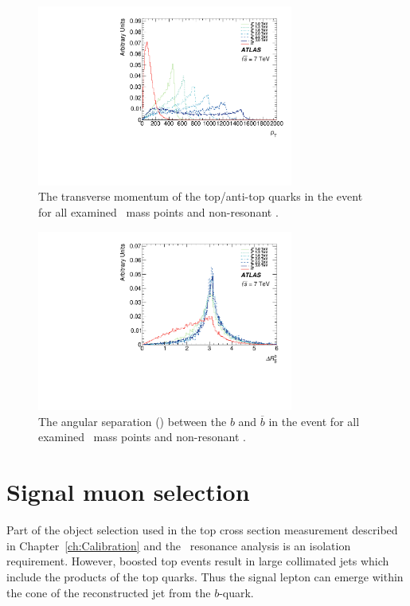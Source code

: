 \begin{figure}[htbp]
  \centering
  \includegraphics[width=0.75\textwidth]{PartBoosted/Plots/h_trtop_pt.pdf}
  \caption{The transverse momentum of the top/anti-top quarks in the event for all examined \Zprime\ mass points and non-resonant \ttbar.} \label{fig:ExampleBoost}
\end{figure}

\begin{figure}[htbp]
  \centering
  \includegraphics[width=0.75\textwidth]{PartBoosted/Plots/h_b_bbar_dr.pdf}
  \caption{The angular separation (\DeltaR) between the $b$ and $\overline{b}$ in the event for all examined \Zprime\ mass points  and non-resonant \ttbar.} \label{fig:ExampleBackToBack}
\end{figure}

\section{Signal muon selection}

Part of the object selection used in the top cross section measurement described in Chapter~\ref{ch:Calibration} and the \ttbar\ resonance analysis is an isolation requirement. However, boosted top events result in large collimated jets which include the products of the top quarks. Thus the signal lepton can emerge within the cone of the reconstructed jet from the $b$-quark. 

